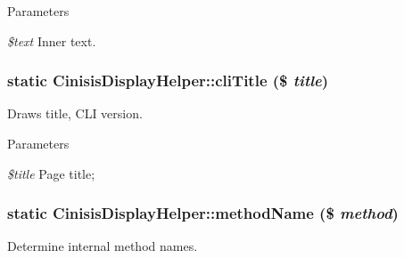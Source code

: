 \begin{DoxyParams}{Parameters}
\item[{\em \$text}]Inner text. \end{DoxyParams}
\hypertarget{classCinisisDisplayHelper_a8f0c8aec5b11a144b14278d287238c85}{
\subsubsection[{cliTitle}]{\setlength{\rightskip}{0pt plus 5cm}static CinisisDisplayHelper::cliTitle (\$ {\em title})}}
\label{classCinisisDisplayHelper_a8f0c8aec5b11a144b14278d287238c85}
Draws title, CLI version.


\begin{DoxyParams}{Parameters}
\item[{\em \$title}]Page title; \end{DoxyParams}
\hypertarget{classCinisisDisplayHelper_ab263cf81e5c459c60baa6ef7fa5f76b2}{
\subsubsection[{methodName}]{\setlength{\rightskip}{0pt plus 5cm}static CinisisDisplayHelper::methodName (\$ {\em method})}}
\label{classCinisisDisplayHelper_ab263cf81e5c459c60baa6ef7fa5f76b2}
Determine internal method names.


